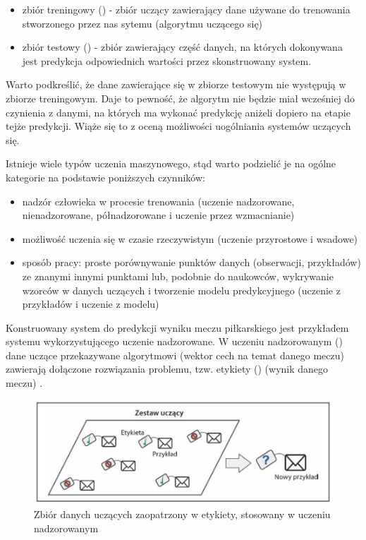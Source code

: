 \begin{itemize}
    \item zbiór treningowy () - zbiór uczący zawierający dane używane do trenowania stworzonego przez nas sytemu (algorytmu uczącego się)
    \item zbiór testowy () - zbiór zawierający część danych, na których dokonywana jest predykcja odpowiednich wartości przez skonstruowany system.
\end{itemize}
Warto podkreślić, że dane zawierające się w zbiorze testowym nie występują w zbiorze treningowym. Daje to pewność, że algorytm nie będzie miał wcześniej do czynienia z danymi, na których ma wykonać predykcję aniżeli dopiero na etapie tejże predykcji. Wiąże się to z oceną możliwości uogólniania systemów uczących się.

Istnieje wiele typów uczenia maszynowego, stąd warto podzielić je na ogólne kategorie na podstawie poniższych czynników:
\begin{itemize}
    \item nadzór człowieka w procesie trenowania (uczenie nadzorowane, nienadzorowane, półnadzorowane i uczenie przez wzmacnianie)
    \item możliwość uczenia się w czasie rzeczywistym (uczenie przyrostowe i wsadowe)
    \item sposób pracy: proste porównywanie punktów danych (obserwacji, przykładów) ze znanymi innymi punktami lub, podobnie do naukowców, wykrywanie wzorców w danych uczących i tworzenie modelu predykcyjnego (uczenie z przykładów i uczenie z modelu)
\end{itemize}

Konstruowany system do predykcji wyniku meczu piłkarskiego jest przykładem systemu wykorzystującego uczenie nadzorowane. W uczeniu nadzorowanym () dane uczące przekazywane algorytmowi (wektor cech na temat danego meczu) zawierają dołączone rozwiązania problemu, tzw. etykiety () (wynik danego meczu) \cite{Geron}. 

\begin{figure}[h] 
        \includegraphics[width=15cm]{figures/supervised-learning.JPG}
        \caption{Zbiór danych uczących zaopatrzony w etykiety, stosowany w uczeniu nadzorowanym}
\end{figure}

